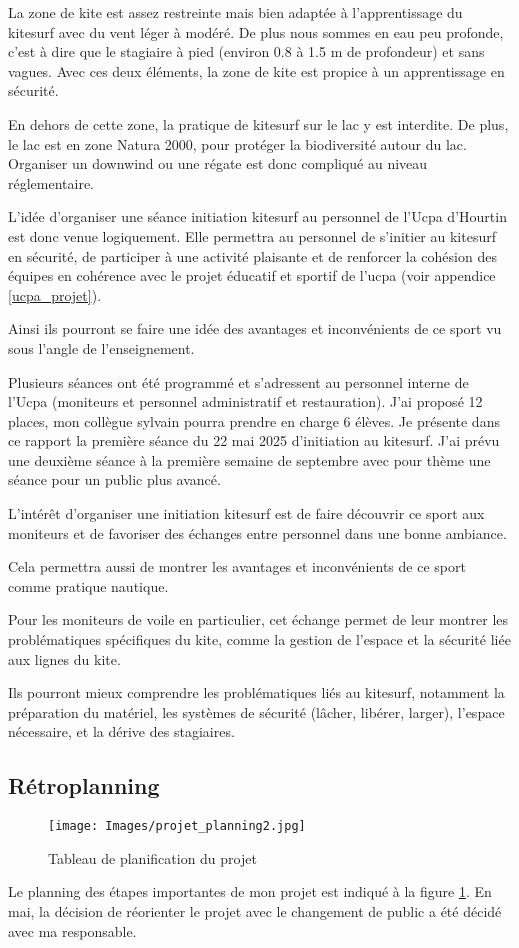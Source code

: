 \documentclass[11pt,a4paper]{report}
\begin{document}
La zone de kite est assez restreinte mais bien adaptée à l'apprentissage
du kitesurf avec du vent léger à modéré. De plus nous sommes en 
eau peu profonde, c'est à dire que le stagiaire à pied (environ 0.8 à 1.5 m
de profondeur) et sans vagues. Avec ces deux éléments, la zone de kite 
est propice à un apprentissage en sécurité.

En dehors de cette zone, la pratique de kitesurf sur le lac
y est interdite. De plus, le lac est en zone Natura 2000\cite{natura2000}, pour
protéger la biodiversité autour du lac.
Organiser un downwind ou une régate est donc  compliqué
au niveau réglementaire.

L'idée d'organiser une séance initiation kitesurf
au personnel de l'Ucpa d'Hourtin est donc venue logiquement.
Elle permettra au personnel de s'initier au kitesurf en 
sécurité, de participer à une activité plaisante
et de renforcer la cohésion des équipes en cohérence avec le 
projet éducatif et sportif de l'ucpa (voir appendice \ref{ucpa_projet}).

Ainsi ils pourront se faire une idée des avantages et
inconvénients de ce sport vu sous l'angle de l'enseignement.

Plusieurs séances ont été programmé et s'adressent au personnel 
interne de l'Ucpa (moniteurs et personnel administratif et
restauration). J'ai  proposé 12 places, mon collègue sylvain
pourra prendre en charge 6 élèves.
Je présente dans ce rapport la première séance du 22 mai 2025 d'initiation 
au kitesurf. J'ai prévu une deuxième séance à la première semaine de
septembre avec pour thème une séance pour un public plus avancé.

L'intér\^et d'organiser une initiation kitesurf est de faire découvrir ce
sport aux moniteurs et de favoriser des échanges entre personnel dans 
une bonne ambiance.

Cela permettra aussi de montrer les avantages
et inconvénients de ce sport comme pratique nautique. 

Pour les moniteurs de voile en particulier, cet échange permet
de leur montrer les problématiques spécifiques du kite, 
comme la gestion de l'espace et la sécurité liée aux lignes du kite.

Ils pourront mieux comprendre les problématiques liés au
kitesurf, notamment la préparation du matériel, les  systèmes de sécurité 
(lâcher, libérer, larger), l'espace nécessaire, et la dérive
des stagiaires.

\subsection{Rétroplanning}
\begin{figure}[h]
\centering
\texttt{[image: Images/projet\_planning2.jpg]} 
\caption{Tableau de planification du projet \label{gantt}}
\end{figure}
Le planning des étapes importantes de mon projet est indiqué
à la figure \ref{gantt}. En mai, la décision de  réorienter 
le projet avec le changement de public a été décidé avec
ma responsable. 
\end{document}

